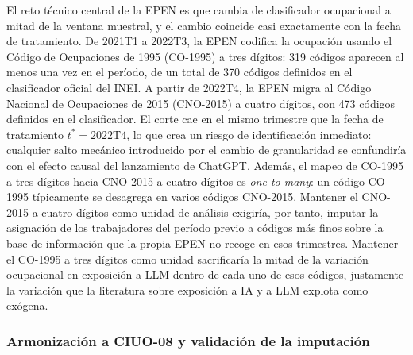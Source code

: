 El reto t\'{e}cnico central de la EPEN es que cambia de clasificador ocupacional a mitad de la ventana muestral, y el cambio coincide casi exactamente con la fecha de tratamiento. De 2021T1 a 2022T3, la EPEN codifica la ocupaci\'{o}n usando el C\'{o}digo de Ocupaciones de 1995 (CO-1995) a tres d\'{i}gitos: 319 c\'{o}digos aparecen al menos una vez en el per\'{i}odo, de un total de 370 c\'{o}digos definidos en el clasificador oficial del INEI. A partir de 2022T4, la EPEN migra al C\'{o}digo Nacional de Ocupaciones de 2015 (CNO-2015) a cuatro d\'{i}gitos, con 473 c\'{o}digos definidos en el clasificador. El corte cae en el mismo trimestre que la fecha de tratamiento $t^{\ast} = 2022\text{T4}$, lo que crea un riesgo de identificaci\'{o}n inmediato: cualquier salto mec\'{a}nico introducido por el cambio de granularidad se confundir\'{i}a con el efecto causal del lanzamiento de ChatGPT. Adem\'{a}s, el mapeo de CO-1995 a tres d\'{i}gitos hacia CNO-2015 a cuatro d\'{i}gitos es \emph{one-to-many}: un c\'{o}digo CO-1995 t\'{i}picamente se desagrega en varios c\'{o}digos CNO-2015. Mantener el CNO-2015 a cuatro d\'{i}gitos como unidad de an\'{a}lisis exigir\'{i}a, por tanto, imputar la asignaci\'{o}n de los trabajadores del per\'{i}odo previo a c\'{o}digos m\'{a}s finos sobre la base de informaci\'{o}n que la propia EPEN no recoge en esos trimestres. Mantener el CO-1995 a tres d\'{i}gitos como unidad sacrificar\'{i}a la mitad de la variaci\'{o}n ocupacional en exposici\'{o}n a LLM dentro de cada uno de esos c\'{o}digos, justamente la variaci\'{o}n que la literatura sobre exposici\'{o}n a IA y a LLM \citep{Felten2023_ai_exposure, Webb2020_ai_exposure, Eloundou2023_gpt_exposure} explota como ex\'{o}gena.

\subsubsection*{Armonizaci\'{o}n a CIUO-08 y validaci\'{o}n de la imputaci\'{o}n}

